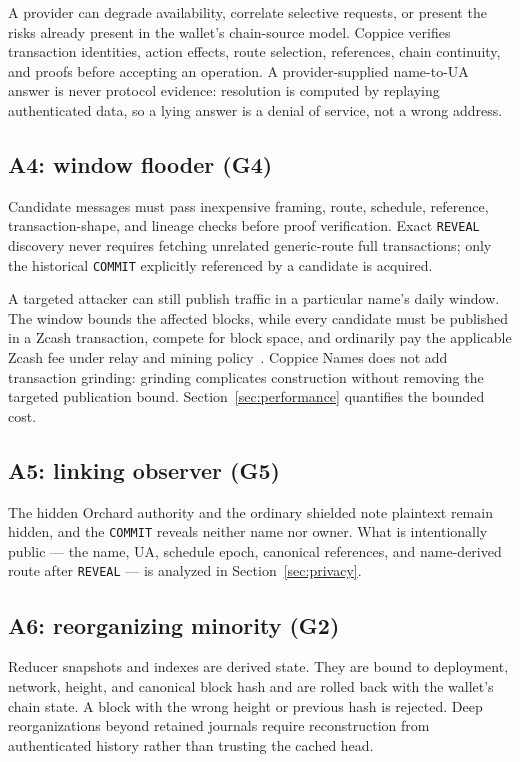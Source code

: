 \documentclass[11pt]{article}
\newcommand{\operation}[1]{\texttt{#1}}
\begin{document}
A provider can degrade availability, correlate selective requests, or present
the risks already present in the wallet's chain-source model. Coppice
verifies transaction identities, action effects, route selection, references,
chain continuity, and proofs before accepting an operation. A
provider-supplied name-to-UA answer is never protocol evidence: resolution is
computed by replaying authenticated data, so a lying answer is a denial of
service, not a wrong address.

\subsection{A4: window flooder (G4)}

Candidate messages must pass inexpensive framing, route, schedule, reference,
transaction-shape, and lineage checks before proof verification. Exact
\operation{REVEAL} discovery never requires fetching unrelated generic-route
full transactions; only the historical \operation{COMMIT} explicitly
referenced by a candidate is acquired.

A targeted attacker can still publish traffic in a particular name's daily
window. The window bounds the affected blocks, while every candidate must be
published in a Zcash transaction, compete for block space, and ordinarily pay
the applicable Zcash fee under relay and mining policy~\cite{zip317}. Coppice
Names does not add transaction grinding: grinding complicates construction
without removing the targeted publication bound. Section~\ref{sec:performance}
quantifies the bounded cost.

\subsection{A5: linking observer (G5)}

The hidden Orchard authority and the ordinary shielded note plaintext remain
hidden, and the \operation{COMMIT} reveals neither name nor owner. What is
intentionally public --- the name, UA, schedule epoch, canonical references,
and name-derived route after \operation{REVEAL} --- is analyzed in
Section~\ref{sec:privacy}.

\subsection{A6: reorganizing minority (G2)}

Reducer snapshots and indexes are derived state. They are bound to
deployment, network, height, and canonical block hash and are rolled back
with the wallet's chain state. A block with the wrong height or previous hash
is rejected. Deep reorganizations beyond retained journals require
reconstruction from authenticated history rather than trusting the cached
head.
\end{document}
